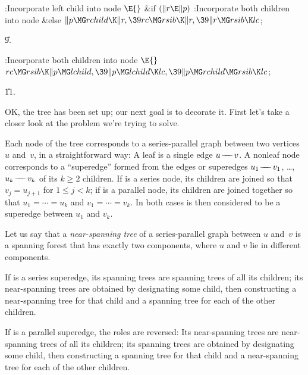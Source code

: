 \B{}:Incorporate left child into node \X${}\E{}$\6
\&{if} ${}(\|r\E\|p){}$\1\5
:Incorporate both children into node \X\2\6
\&{else}\1\5
${}\|p\MG\\{rchild}\K\|r,\39\\{rc}\MG\\{rsib}\K\|r,\39\|r\MG\\{rsib}\K%
\\{lc}{}$;\2\par
\U9.\fi

\B{}:Incorporate both children into node \X${}%
\E{}$\6
$\\{rc}\MG\\{rsib}\K\|p\MG\\{lchild},\39\|p\MG\\{lchild}\K\\{lc},\39\|p\MG%
\\{rchild}\MG\\{rsib}\K\\{lc}{}$;\par
\U11.\fi

OK, the tree has been set up; our next goal is to decorate
it.
First let's take a closer look at the problem we're trying to solve.

Each node of the tree corresponds to a series-parallel graph between
two vertices $u$ and~$v$, in a straightforward way: A leaf is a
single edge $u\mathrel{\!\mathrel-\mkern-8mu\mathrel-\mkern-8mu\mathrel-\!} v$. A nonleaf node~ corresponds to a ``superedge''
formed from the edges or superedges $u_1\mathrel{\!\mathrel-\mkern-8mu\mathrel-\mkern-8mu\mathrel-\!} v_1$, \dots, $u_k\mathrel{\!\mathrel-\mkern-8mu\mathrel-\mkern-8mu\mathrel-\!} v_k$
of its $k\ge2$ children. If  is a series node, its children are
joined so that $v_j=u_{j+1}$ for $1\le j<k$; if  is a parallel
node, its children are joined together so that $u_1=\cdots=u_k$ and
$v_1=\cdots=v_k$. In both cases  is then considered to be a
superedge between $u_1$ and $v_k$.

Let us say that a {\it near-spanning tree\/} of a series-parallel graph
between $u$ and~$v$ is a spanning forest that has exactly two components,
where $u$ and $v$ lie in different components.

If  is a series superedge, its spanning trees are spanning trees of all
its children; its near-spanning trees are obtained by designating some child,
then constructing a near-spanning tree for that child and a spanning tree
for each of the other children.

If  is a parallel superedge, the roles are reversed: Its near-spanning
trees are near-spanning trees of all its children; its spanning trees are
obtained by designating some child, then constructing a spanning tree for
that child and a near-spanning tree for each of the other children.

